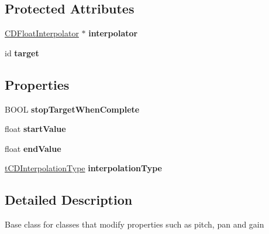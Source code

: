\subsection*{Protected Attributes}
\begin{DoxyCompactItemize}
\item 
\hypertarget{interface_c_d_property_modifier_a8194c033d1601b3f9e6e27af913ccb5a}{\hyperlink{interface_c_d_float_interpolator}{C\-D\-Float\-Interpolator} $\ast$ {\bfseries interpolator}}\label{interface_c_d_property_modifier_a8194c033d1601b3f9e6e27af913ccb5a}

\item 
\hypertarget{interface_c_d_property_modifier_aef69ec3f2df7a26a7164ddc0f8a5006c}{id {\bfseries target}}\label{interface_c_d_property_modifier_aef69ec3f2df7a26a7164ddc0f8a5006c}

\end{DoxyCompactItemize}
\subsection*{Properties}
\begin{DoxyCompactItemize}
\item 
\hypertarget{interface_c_d_property_modifier_a2bf99139e87f664206e7b136b8e5f358}{B\-O\-O\-L {\bfseries stop\-Target\-When\-Complete}}\label{interface_c_d_property_modifier_a2bf99139e87f664206e7b136b8e5f358}

\item 
\hypertarget{interface_c_d_property_modifier_ad8f165bf19b08dd43cf941ecc40154fd}{float {\bfseries start\-Value}}\label{interface_c_d_property_modifier_ad8f165bf19b08dd43cf941ecc40154fd}

\item 
\hypertarget{interface_c_d_property_modifier_a19c9dbbd4898b0ce15fd9d3eb4e38c59}{float {\bfseries end\-Value}}\label{interface_c_d_property_modifier_a19c9dbbd4898b0ce15fd9d3eb4e38c59}

\item 
\hypertarget{interface_c_d_property_modifier_af453b40550152fcb2e7d355ff6314e6a}{\hyperlink{_cocos_denshion_8h_abf5e3c49618c14630377c3696e7a3ab9}{t\-C\-D\-Interpolation\-Type} {\bfseries interpolation\-Type}}\label{interface_c_d_property_modifier_af453b40550152fcb2e7d355ff6314e6a}

\end{DoxyCompactItemize}


\subsection{Detailed Description}
Base class for classes that modify properties such as pitch, pan and gain 

